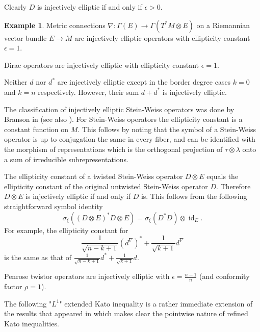 \documentclass[12pt]{amsart} %
\theoremstyle{definition}
\newtheorem{example}[theorem]{Example}
\numberwithin{equation}{section}
\DeclareMathOperator{\id}{id}
\newcommand{\ra}{\rightarrow}
\begin{document}
Clearly $D$ is injectively elliptic if and only if $\epsilon>0$.

\begin{example}

\item[(1)] Metric connections $\nabla:\Gamma(E)\ra \Gamma(T^ *M\otimes E)$ on a Riemannian vector bundle $E \ra M$ are injectively elliptic operators with ellipticity constant $\epsilon=1$.

\item[(2)] Dirac operators are injectively elliptic with ellipticity constant $\epsilon=1$.

\item[(3)] Neither $d$ nor $d^ *$ are injectively elliptic except in the border degree cases $k=0$ and $k=n$ respectively. However, their sum $d+d^ *$ is injectively elliptic.

\item[(4)] The classification of injectively elliptic Stein-Weiss operators was done by Branson in \cite{Br1} (see also \cite{Pi}).  For Stein-Weiss operators the ellipticity constant is a constant function on $M$. This follows by noting that the symbol of a Stein-Weiss operator is up to conjugation the same in every fiber, and can be identified with the morphism of representations which is the orthogonal projection of $\tau\otimes \lambda$ onto a sum of irreducible subrepresentations. 

\item[(5)] The ellipticity constant of a twisted Stein-Weiss operator $D\otimes E$ equals the ellipticity constant of the original untwisted Stein-Weiss operator $D$. Therefore $D\otimes E$ is injectively elliptic if and only if $D$ is.  This follows from the following straightforward symbol identity 
\[\sigma_{\xi}((D\otimes E)^ *D\otimes E)=\sigma_{\xi}(D^ *D)\otimes \id_E.\]
 For example, the ellipticity constant for 
\[ \frac{1}{\sqrt{n-k+1}}(d^{\nabla})^ *+\frac{1}{\sqrt{k+1}}d^ {\nabla}\]
is the same as that of $\frac{1}{\sqrt{n-k+1}}d^ *+\frac{1}{\sqrt{k+1}}d$.

\item[(6)] Penrose twistor operators are injectively elliptic with $\epsilon=\frac{n-1}{n}$ (and conformity factor $\rho = 1$).
\end{example}

The following "$L^1$" extended Kato inequality is a rather immediate extension of the results that appeared in \cite{B2000,CGH2000} which makes clear the pointwise nature of refined Kato inequalities. 
\end{document}
